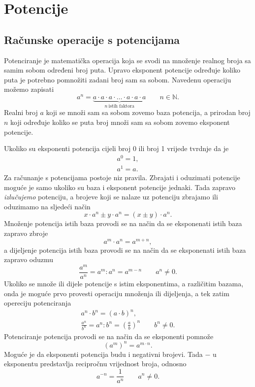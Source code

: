 \chapter{Potencije}\label{ch:potencije}

\section{Računske operacije s potencijama}\label{sec:računske-operacije-s-potencijama}

Potenciranje je matematička operacija koja se svodi na množenje realnog broja sa samim sobom određeni broj puta.
Upravo eksponent potencije određuje koliko puta je potrebno pomnožiti zadani broj sam sa sobom.
Navedenu operaciju možemo zapisati
\[ a^n = \underbrace{a \cdot a \cdot a \cdot \ldots \cdot a \cdot a \cdot a}_{n \ \text{istih faktora}} \qquad n \in \mathbb{N}. \]
Realni broj $a$ koji se množi sam sa sobom zovemo baza potencija, a prirodan broj $n$ koji određuje koliko se puta broj množi sam sa sobom zovemo eksponent potencije.

Ukoliko su eksponenti potencija cijeli broj 0 ili broj 1 vrijede tvrdnje da je
\begin{gather*}
    a^0 = 1,\\
    a^1 = a.
\end{gather*}
Za računanje s potencijama postoje niz pravila.
Zbrajati i oduzimati potencije moguće je samo ukoliko su baza i eksponent potencije jednaki.
Tada zapravo \emph{izlučujemo} potenciju, a brojeve koji se nalaze uz potenciju zbrajamo ili oduzimamo na sljedeći način
\[ x \cdot a^n \pm y \cdot a^n = (x \pm y) \cdot a^n. \]
Množenje potencija istih baza provodi se na način da se eksponenati istih baza zapravo zbroje
\[ a^m \cdot a^n = a^{m+n}, \]
a dijeljenje potencija istih baza provodi se na način da se eksponenati istih baza zapravo oduzmu
\[ \frac{a^m}{a^n} = a^m : a^n = a^{m-n} \qquad a^n \neq 0. \]
Ukoliko se množe ili dijele potencije s istim eksponentima, a različitim bazama, onda je moguće prvo provesti operaciju množenja ili dijeljenja, a tek zatim opereciju potenciranja
\begin{gather*}
    a^n \cdot b^n = (a \cdot b)^n,\\
    \frac{a^n}{b^n} = a^n : b^n = \left( \frac{a}{b} \right)^n \qquad b^n \neq 0.
\end{gather*}
Potenciranje potencija provodi se na način da se eksponenti pomnože
\[ (a^m)^n = a^{m \cdot n}. \]
Moguće je da eksponenti potencija budu i negativni brojevi.
Tada $-$ u eksponentu predstavlja recipročnu vrijednost broja, odnosno
\[ a^{-n} = \frac{1}{a^n} \qquad a^n \neq 0. \]

